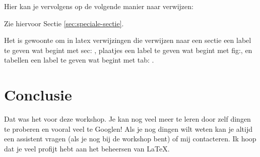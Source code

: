 \documentclass[a4paper,10pt]{article}
\begin{document}
Hier kan je vervolgens op de volgende manier naar verwijzen: 

\begin{verbbox}
Zie hiervoor Sectie \ref{sec:speciale-sectie}. 
\end{verbbox}
\theverbbox

Het is gewoonte om in latex verwijzingen die verwijzen naar een sectie een label te geven wat begint met sec: , plaatjes een label te geven wat begint met fig:, en tabellen een label te geven wat begint met tab: . 
\section{Conclusie}
Dat was het voor deze workshop. Je kan nog veel meer te leren door zelf dingen te proberen en vooral veel te Googlen! Als je nog dingen wilt weten kan je altijd een assistent vragen (als je nog bij de workshop bent) of mij contacteren. Ik hoop dat je veel profijt hebt aan het beheersen van \LaTeX.
\end{document}
